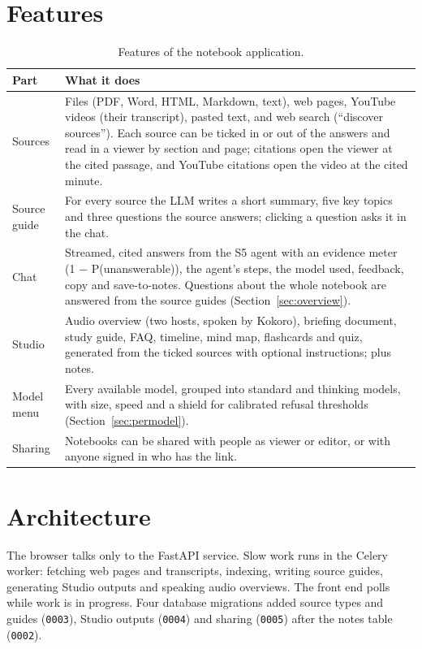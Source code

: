 \section{Features}
\begin{table}[H]
\centering\small
\begin{tabularx}{\textwidth}{@{}p{2.3cm}Y@{}}
\toprule
Part & What it does \\
\midrule
Sources & Files (PDF, Word, HTML, Markdown, text), web pages, YouTube videos (their transcript), pasted text, and web search (``discover sources''). Each source can be ticked in or out of the answers and read in a viewer by section and page; citations open the viewer at the cited passage, and YouTube citations open the video at the cited minute. \\
Source guide & For every source the LLM writes a short summary, five key topics and three questions the source answers; clicking a question asks it in the chat. \\
Chat & Streamed, cited answers from the S5 agent with an evidence meter (1 $-$ P(unanswerable)), the agent's steps, the model used, feedback, copy and save-to-notes. Questions about the whole notebook are answered from the source guides (Section~\ref{sec:overview}). \\
Studio & Audio overview (two hosts, spoken by Kokoro), briefing document, study guide, FAQ, timeline, mind map, flashcards and quiz, generated from the ticked sources with optional instructions; plus notes. \\
Model menu & Every available model, grouped into standard and thinking models, with size, speed and a shield for calibrated refusal thresholds (Section~\ref{sec:permodel}). \\
Sharing & Notebooks can be shared with people as viewer or editor, or with anyone signed in who has the link. \\
\bottomrule
\end{tabularx}
\caption{Features of the notebook application.}
\label{tab:notebook}
\end{table}

\section{Architecture}
The browser talks only to the FastAPI service. Slow work runs in the Celery worker: fetching web pages and transcripts, indexing, writing source guides, generating Studio outputs and speaking audio overviews. The front end polls while work is in progress. Four database migrations added source types and guides (\texttt{0003}), Studio outputs (\texttt{0004}) and sharing (\texttt{0005}) after the notes table (\texttt{0002}).

